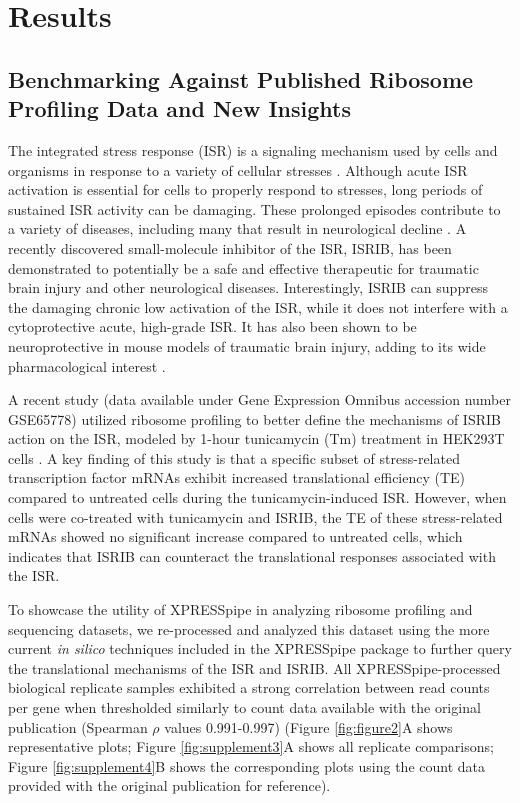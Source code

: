 \documentclass[10pt, oneside]{article}
\begin{document}
\section*{Results}
\subsection*{Benchmarking Against Published Ribosome Profiling Data and New Insights}
The integrated stress response (ISR) is a signaling mechanism used by cells and organisms in response to a variety of cellular stresses \cite{harding_isr}. Although acute ISR activation is essential for cells to properly respond to stresses, long periods of sustained ISR activity can be damaging. These prolonged episodes contribute to a variety of diseases, including many that result in neurological decline \cite{isr_disease}. A recently discovered small-molecule inhibitor of the ISR, ISRIB, has been demonstrated to potentially be a safe and effective therapeutic for traumatic brain injury and other neurological diseases. Interestingly, ISRIB can suppress the damaging chronic low activation of the ISR, while it does not interfere with a cytoprotective acute, high-grade ISR. It has also been shown to be neuroprotective in mouse models of traumatic brain injury, adding to its wide pharmacological interest \cite{isrib_activation, isrib_structure, isrib_riboseq, isrib_neuroprotective, isrib_neuroprotective2, isrib_neuroprotective3, isrib_neuroprotective4}. \par

A recent study (data available under Gene Expression Omnibus accession number GSE65778) utilized ribosome profiling to better define the mechanisms of ISRIB action on the ISR, modeled by 1-hour tunicamycin (Tm) treatment in HEK293T cells \cite{isrib_riboseq}. A key finding of this study is that a specific subset of stress-related transcription factor mRNAs exhibit increased translational efficiency (TE) compared to untreated cells during the tunicamycin-induced ISR. However, when cells were co-treated with tunicamycin and ISRIB, the TE of these stress-related mRNAs showed no significant increase compared to untreated cells, which indicates that ISRIB can counteract the translational responses associated with the ISR. \par

To showcase the utility of XPRESSpipe in analyzing ribosome profiling and sequencing datasets, we re-processed and analyzed this dataset using the more current \textit{in silico} techniques included in the XPRESSpipe package to further query the translational mechanisms of the ISR and ISRIB. All XPRESSpipe-processed biological replicate samples exhibited a strong correlation between read counts per gene when thresholded similarly to count data available with the original publication (Spearman $\rho$ values 0.991-0.997) (Figure \ref{fig:figure2}A shows representative plots; Figure \ref{fig:supplement3}A shows all replicate comparisons; Figure \ref{fig:supplement4}B shows the corresponding plots using the count data provided with the original publication for reference). \par
\end{document}
